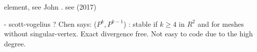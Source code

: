 
\textcite{scvo85} element, see John \cite[p70]{john16}. see \textcite{jolm17} (2017)

- scott-vogelius ? Chen says: ($P^k ,P^{k-1}$) : stable if $k \ge 4$ in $R^2$ and for meshes without
singular-vertex. Exact divergence free. Not easy to code due to the high degree.

